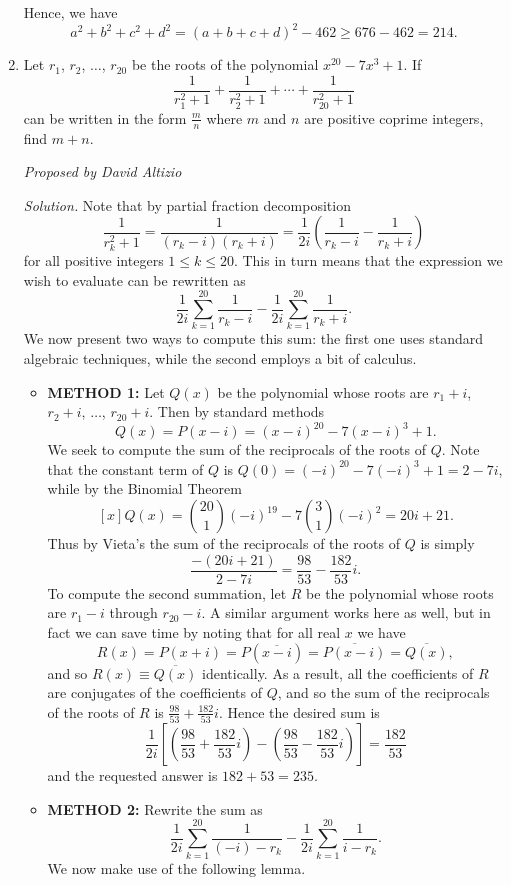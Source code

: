 \documentclass[10pt]{article}
\newcommand{\proposed}[1]
{
\vspace{5pt}
\noindent\textit{Proposed by #1}
}
\newcommand{\solution}
{
\vspace{5pt}
\noindent\textit{Solution.}\qquad
}
\begin{document}
\begin{enumerate}
\par Hence, we have \[a^2+b^2+c^2+d^2=(a+b+c+d)^2-462\geq 676-462=\boxed{214}.\]

\item Let $r_1$, $r_2$, $\ldots$, $r_{20}$ be the roots of the polynomial $x^{20}-7x^3+1$.  If \[\dfrac{1}{r_1^2+1}+\dfrac{1}{r_2^2+1}+\cdots+\dfrac{1}{r_{20}^2+1}\] can be written in the form $\tfrac mn$ where $m$ and $n$ are positive coprime integers, find $m+n$.

\proposed{David Altizio}

\solution Note that by partial fraction decomposition \[\dfrac{1}{r_k^2+1}=\dfrac{1}{(r_k-i)(r_k+i)}=\dfrac{1}{2i}\left(\dfrac{1}{r_k-i}-\dfrac{1}{r_k+i}\right)\] for all positive integers $1\leq k\leq 20$.  This in turn means that the expression we wish to evaluate can be rewritten as \[\frac{1}{2i}\sum_{k=1}^{20}\dfrac1{r_k-i}-\dfrac1{2i}\sum_{k=1}^{20}\dfrac1{r_k+i}.\] We now present two ways to compute this sum: the first one uses standard algebraic techniques, while the second employs a bit of calculus.

\begin{itemize}

\item\textbf{METHOD 1: }Let $Q(x)$ be the polynomial whose roots are $r_1+i$, $r_2+i$, $\ldots$, $r_{20}+i$.  Then by standard methods \[Q(x)=P(x-i)=(x-i)^{20}-7(x-i)^3+1.\] We seek to compute the sum of the reciprocals of the roots of $Q$.  Note that the constant term of $Q$ is $Q(0)=(-i)^{20}-7(-i)^3+1=2-7i$, while by the Binomial Theorem \[[x]Q(x) = \binom{20}1(-i)^{19}-7\binom31(-i)^2=20i+21.\] Thus by Vieta's the sum of the reciprocals of the roots of $Q$ is simply \[\dfrac{-(20i+21)}{2-7i}=\dfrac{98}{53}-\dfrac{182}{53}i.\] To compute the second summation, let $R$ be the polynomial whose roots are $r_1-i$ through $r_{20}-i$.  A similar argument works here as well, but in fact we can save time by noting that for all real $x$ we have \[R(x) = P(x+i) = P(\overline{x-i}) = \overline{P(x-i)}=\overline{Q(x)},\] and so $R(x)\equiv\overline{Q(x)}$ identically.  As a result, all the coefficients of $R$ are conjugates of the coefficients of $Q$, and so the sum of the reciprocals of the roots of $R$ is $\tfrac{98}{53}+\tfrac{182}{53}i$.  Hence the desired sum is \[\dfrac1{2i}\left[\left(\dfrac{98}{53}+\frac{182}{53}i\right)-\left(\frac{98}{53}-\frac{182}{53}i\right)\right]=\dfrac{182}{53}\] and the requested answer is $182+53=\boxed{235}.$

\item\textbf{METHOD 2:} Rewrite the sum as \[\frac{1}{2i}\sum_{k=1}^{20}\dfrac1{(-i)-r_k}-\dfrac1{2i}\sum_{k=1}^{20}\dfrac1{i-r_k}.\] We now make use of the following lemma.


\end{itemize}
\end{enumerate}
\end{document}
